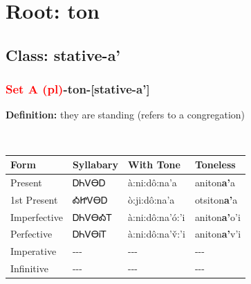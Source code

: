 \needspace{4in}
\section*{Root: ton}
\nopagebreak
{}
\needspace{3in}
\subsection*{Class: stative-a'}
\nopagebreak
\needspace{2in}
\subsubsection*{\textcolor{Red}{Set A (pl)}{-}\textbf{ton}{-}[stative-a']}
\nopagebreak
\textbf{Definition: } they are standing (refers to a congregation)
\\[0.5em]
\begin{tabularx}{\textwidth}{l X X X}%
\toprule%
\textbf{Form}&\textbf{Syllabary}&\textbf{With Tone}&\textbf{Toneless}\\%
\midrule%
Present&ᎠᏂᏙᎾᎠ&à:ni:dô:na’a&aniton\textbf{a'}a\\%
1st Present&ᎣᏥᏙᎾᎠ&ò:ji:dô:na’a&otsiton\textbf{a'}a\\%
Imperfective&ᎠᏂᏙᎾᎣᎢ&à:ni:dô:na’ó:’i&aniton\textbf{a'}o'i\\%
Perfective&ᎠᏂᏙᎾᎥᎢ&à:ni:dô:na’v̌:’i&aniton\textbf{a'}v'i\\%
Imperative&{-}{-}{-}&{-}{-}{-}&{-}{-}{-}\\%
Infinitive&{-}{-}{-}&{-}{-}{-}&{-}{-}{-}\\%
\bottomrule%
\end{tabularx}
\\[1em]